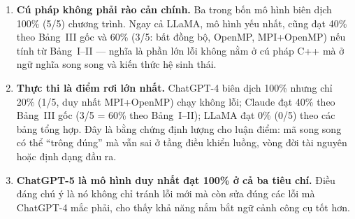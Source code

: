 \begin{enumerate}
  \item \textbf{Cú pháp không phải rào cản chính.} Ba trong bốn mô hình biên dịch
        100\% (5/5) chương trình. Ngay cả LLaMA, mô hình yếu nhất, cũng đạt 40\%
        theo Bảng~III gốc và 60\% (3/5: bất đồng bộ, OpenMP, MPI+OpenMP) nếu tính
        từ Bảng~I--II — nghĩa là phần lớn lỗi không nằm ở cú pháp C++ mà ở ngữ
        nghĩa song song và kiến thức hệ sinh thái.
  \item \textbf{Thực thi là điểm rơi lớn nhất.} ChatGPT-4 biên dịch 100\% nhưng
        chỉ 20\% (1/5, duy nhất MPI+OpenMP) chạy không lỗi; Claude đạt 40\% theo
        Bảng~III gốc (3/5 = 60\% theo Bảng~I--II); LLaMA đạt 0\% (0/5) theo các
        bảng tổng hợp. Đây là bằng chứng định lượng cho luận điểm: mã song song có
        thể “trông đúng” mà vẫn sai ở tầng điều khiển luồng, vòng đời tài nguyên
        hoặc định dạng đầu ra.
  \item \textbf{ChatGPT-5 là mô hình duy nhất đạt 100\% ở cả ba tiêu chí.} Điều
        đáng chú ý là nó không chỉ tránh lỗi mới mà còn sửa đúng các lỗi mà
        ChatGPT-4 mắc phải, cho thấy khả năng nắm bắt ngữ cảnh công cụ tốt hơn.
\end{enumerate}

